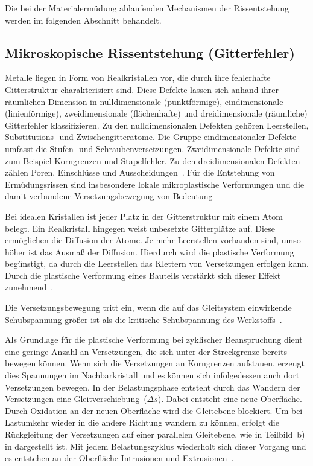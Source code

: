 Die bei der Materialermüdung ablaufenden Mechanismen der Rissentstehung werden im folgenden Abschnitt behandelt.
\clearpage

	\subsection{Mikroskopische Rissentstehung (Gitterfehler)}
Metalle liegen in Form von Realkristallen vor, die durch ihre fehlerhafte Gitterstruktur charakterisiert sind. Diese Defekte lassen sich anhand ihrer räumlichen Dimension in nulldimensionale (punktförmige), eindimensionale (linienförmige), zweidimensionale (flächenhafte) und dreidimensionale (räumliche) Gitterfehler klassifizieren. Zu den nulldimensionalen Defekten gehören Leerstellen, Substitutions- und Zwischengitteratome. Die Gruppe eindimensionaler Defekte umfasst die Stufen- und Schraubenversetzungen. Zweidimensionale Defekte sind zum Beispiel Korngrenzen und Stapelfehler. Zu den dreidimensionalen Defekten zählen Poren, Einschlüsse und Ausscheidungen~\cite[Kap.~2.2.1]{Werkstoffkunde2015}. Für die Entstehung von Ermüdungsrissen sind insbesondere lokale
mikroplastische Verformungen und die damit verbundene
Versetzungsbewegung von Bedeutung~\cite[Seite~265--267]{Werkstofftechnik-Praktikum2021}

Bei idealen Kristallen ist jeder Platz in der Gitterstruktur mit einem Atom belegt. Ein Realkristall hingegen weist unbesetzte Gitterplätze auf. Diese ermöglichen die Diffusion der Atome. Je mehr Leerstellen vorhanden sind, umso höher ist das Ausmaß der Diffusion. Hierdurch wird die plastische Verformung begünstigt, da durch die Leerstellen das Klettern von Versetzungen erfolgen kann. Durch die plastische Verformung eines Bauteils verstärkt sich dieser Effekt zunehmend~\cite[Kap.~2.2.1]{Werkstofftechnik2018}.

Die Versetzungsbewegung tritt ein, wenn die auf das Gleitsystem einwirkende Schubspannung größer ist als die kritische Schubspannung des Werkstoffs~\cite[Seite~88]{Werkstofftechnik-Praktikum2021}. 

Als Grundlage für die plastische Verformung bei zyklischer Beanspruchung dient eine geringe Anzahl an Versetzungen, die sich unter der Streckgrenze bereits bewegen können. Wenn sich die Versetzungen an Korngrenzen aufstauen, erzeugt dies Spannungen im Nachbarkristall und es können sich infolgedessen auch dort Versetzungen bewegen. In der Belastungsphase entsteht durch das Wandern der Versetzungen eine Gleitverschiebung~($\Delta s$). Dabei entsteht eine neue Oberfläche. Durch Oxidation an der neuen Oberfläche wird die Gleitebene blockiert. Um bei Lastumkehr wieder in die andere Richtung wandern zu können, erfolgt die Rückgleitung der Versetzungen auf einer parallelen Gleitebene, wie in Teilbild~b) in  dargestellt ist. Mit jedem Belastungszyklus wiederholt sich dieser Vorgang und es entstehen an der Oberfläche Intrusionen und Extrusionen~\cite[Seite~265--267]{Werkstofftechnik-Praktikum2021}. 

